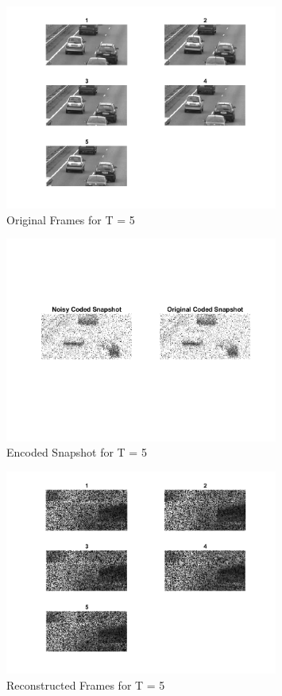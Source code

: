 \documentclass[a4paper,12pt]{article}
\begin{document}
\begin{figure}[htbp]
  \centering
  \includegraphics[width=0.8\textwidth]{../images/original_frames_5.png}
  \caption{Original Frames for T = 5}
\end{figure}

\begin{figure}[htbp]
  \centering
  \includegraphics[width=0.8\textwidth]{../images/noisy_coded_snapshot_5.png}
  \caption{Encoded Snapshot for T = 5}
\end{figure}

\begin{figure}[htbp]
  \centering
  \includegraphics[width=0.8\textwidth]{../images/reconstructed_frames_5.png}
  \caption{Reconstructed Frames for T = 5}
\end{figure}
\end{document}
